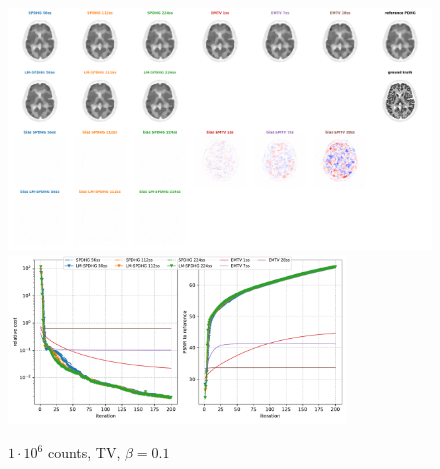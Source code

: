 \begin{figure}
  \centering
    \includegraphics[width=1.0\textwidth]{./figs/brain2d_counts_1.0E+06_seed_1_beta_1.0E-01_prior_TV_niter_ref_20000_fwhm_4.5_4.5_niter_200.png}
    \includegraphics[width=0.8\textwidth]{./figs/brain2d_counts_1.0E+06_seed_1_beta_1.0E-01_prior_TV_niter_ref_20000_fwhm_4.5_4.5_niter_200_metrics.pdf}
  \caption{$1\cdot10^6$ counts, TV, $\beta = 0.1$}
  \label{fig:metrics}
\end{figure}

